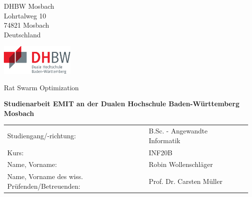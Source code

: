 \def\title{Rat Swarm Optimization}
\def\author{Robin Wollenschläger}

\begin{titlepage}


    \begin{minipage}[t]{0.25\textwidth}
        DHBW Mosbach\\
        Lohrtalweg 10\\
        74821 Mosbach\\
        Deutschland
    \end{minipage}
    \hfill
    \begin{minipage}[t]{0.25\textwidth}
        \includegraphics[height=1.5cm]{prefix/image/logo-dhbw.eps}
    \end{minipage}




    \begin{center}
        \vspace{10mm}

        \huge \title

        \vspace{5mm}

        \large \bfseries Studienarbeit EMIT an der Dualen Hochschule Baden-Württemberg Mosbach


    \end{center}

    \vspace{10mm}

    \begin{tabular}[ht]{ l p{4cm} l p{4cm} }
        Studiengang/-richtung:                               & B.Sc. - Angewandte Informatik  \tabularnewline
        Kurs:                                                & INF20B\tabularnewline
        Name, Vorname:                                       & \author \tabularnewline
        Name, Vorname des wiss. Prüfenden/Betreuenden:       & Prof. Dr. Carsten Müller \tabularnewline
    \end{tabular}



\end{titlepage}
